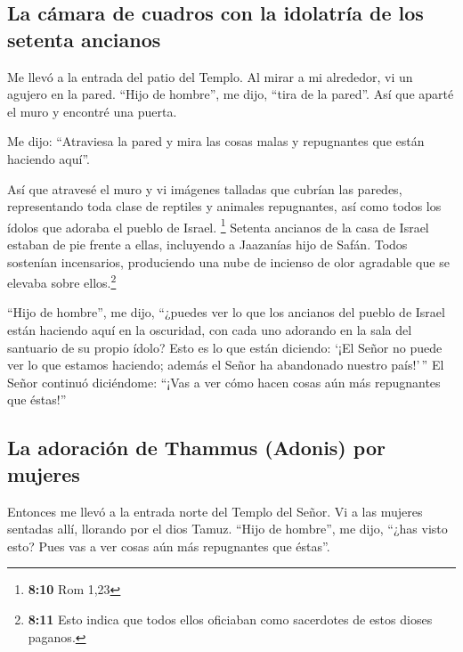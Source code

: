 \hypertarget{la-cuxe1mara-de-cuadros-con-la-idolatruxeda-de-los-setenta-ancianos}{%
\subsection{La cámara de cuadros con la idolatría de los setenta
ancianos}\label{la-cuxe1mara-de-cuadros-con-la-idolatruxeda-de-los-setenta-ancianos}}

 Me llevó a la entrada del patio del Templo. Al mirar a mi
alrededor, vi un agujero en la pared.  ``Hijo de hombre'',
me dijo, ``tira de la pared''. Así que aparté el muro y encontré una
puerta.

 Me dijo: ``Atraviesa la pared y mira las cosas malas y
repugnantes que están haciendo aquí''.

 Así que atravesé el muro y vi imágenes talladas que
cubrían las paredes, representando toda clase de reptiles y animales
repugnantes, así como todos los ídolos que adoraba el pueblo de Israel.
\footnote{\textbf{8:10} Rom 1,23}  Setenta ancianos de la
casa de Israel estaban de pie frente a ellas, incluyendo a Jaazanías
hijo de Safán. Todos sostenían incensarios, produciendo una nube de
incienso de olor agradable que se elevaba sobre ellos.\footnote{\textbf{8:11}
  Esto indica que todos ellos oficiaban como sacerdotes de estos dioses
  paganos.}

 ``Hijo de hombre'', me dijo, ``¿puedes ver lo que los
ancianos del pueblo de Israel están haciendo aquí en la oscuridad, con
cada uno adorando en la sala del santuario de su propio ídolo? Esto es
lo que están diciendo: `¡El Señor no puede ver lo que estamos haciendo;
además el Señor ha abandonado nuestro país!'\,''  El
Señor continuó diciéndome: ``¡Vas a ver cómo hacen cosas aún más
repugnantes que éstas!''

\hypertarget{la-adoraciuxf3n-de-thammus-adonis-por-mujeres}{%
\subsection{La adoración de Thammus (Adonis) por
mujeres}\label{la-adoraciuxf3n-de-thammus-adonis-por-mujeres}}

 Entonces me llevó a la entrada norte del Templo del
Señor. Vi a las mujeres sentadas allí, llorando por el dios Tamuz.
 ``Hijo de hombre'', me dijo, ``¿has visto esto? Pues vas
a ver cosas aún más repugnantes que éstas''.

